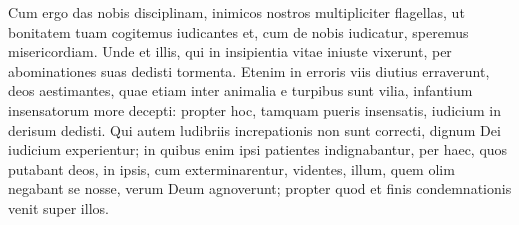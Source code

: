 \begin{biblechapter}
\verse Cum ergo das nobis disciplinam, inimicos nostros multipliciter flagellas, ut bonitatem tuam cogitemus iudicantes et, cum de nobis iudicatur, speremus misericordiam. 
\verse Unde et illis, qui in insipientia vitae iniuste vixerunt, per abominationes suas dedisti tormenta. 
\verse Etenim in erroris viis diutius erraverunt, deos aestimantes, quae etiam inter animalia e turpibus sunt vilia, infantium insensatorum more decepti: 
\verse propter hoc, tamquam pueris insensatis, iudicium in derisum dedisti. 
\verse Qui autem ludibriis increpationis non sunt correcti, dignum Dei iudicium experientur; 
\verse in quibus enim ipsi patientes indignabantur, per haec, quos putabant deos, in ipsis, cum exterminarentur, videntes, illum, quem olim negabant se nosse, verum Deum agnoverunt; propter quod et finis condemnationis venit super illos. 
\end{biblechapter}

